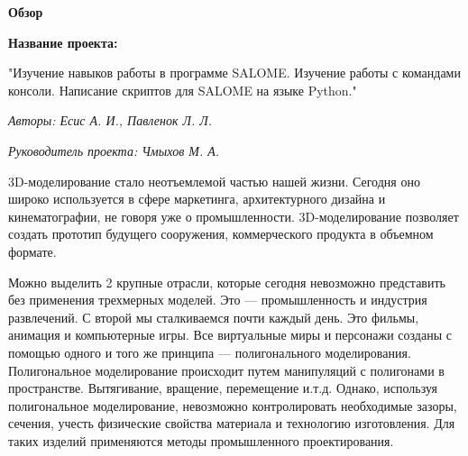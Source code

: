 \documentclass[a4paper,12pt]{article}
\theoremstyle{plain} %
\theoremstyle{definition} %
\theoremstyle{remark} %
\begin{document}
	
	\begin{center}
		
		{\Large\textbf{Обзор}}
		
		\textbf{Название проекта: }
		
		"Изучение навыков работы в программе SALOME. Изучение работы с командами консоли. Написание скриптов для SALOME на языке Python."
		
		\textit{Авторы: Есис А. И., Павленок Л. Л.}
		
		\textit{Руководитель проекта: Чмыхов М. А.}
		
	\end{center}

	3D-моделирование стало неотъемлемой частью нашей жизни. Сегодня оно широко используется в сфере маркетинга, архитектурного дизайна и кинематографии, не говоря уже о промышленности. 3D-моделирование позволяет создать прототип будущего сооружения, коммерческого продукта в объемном формате.
	
	Можно выделить 2 крупные отрасли, которые сегодня невозможно представить без применения трехмерных моделей. Это — промышленность и индустрия развлечений.
	С второй мы сталкиваемся почти каждый день. Это фильмы, анимация и компьютерные игры. Все виртуальные миры и персонажи созданы с помощью одного и того же принципа — полигонального моделирования. Полигональное моделирование происходит путем манипуляций с полигонами в пространстве. Вытягивание, вращение, перемещение и.т.д. Однако, используя полигональное моделирование, невозможно контролировать необходимые зазоры, сечения, учесть физические свойства материала и технологию изготовления. Для таких изделий применяются методы промышленного проектирования.
		
\end{document}
